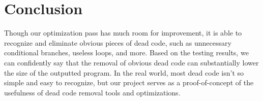 \documentclass[sigconf]{acmart}
\begin{document}
\section{Conclusion}
Though our optimization pass has much room for improvement, it is able to recognize 
and eliminate obvious pieces of dead code, such as unnecessary conditional branches, 
useless loops, and more. Based on the testing results, we can confidently say that the removal of obvious dead code 
can substantially lower the size of the outputted program. In the real world, most 
dead code isn't so simple and easy to recognize, but our project serves as a 
proof-of-concept of the usefulness of dead code removal tools and optimizations. 
\end{document}
